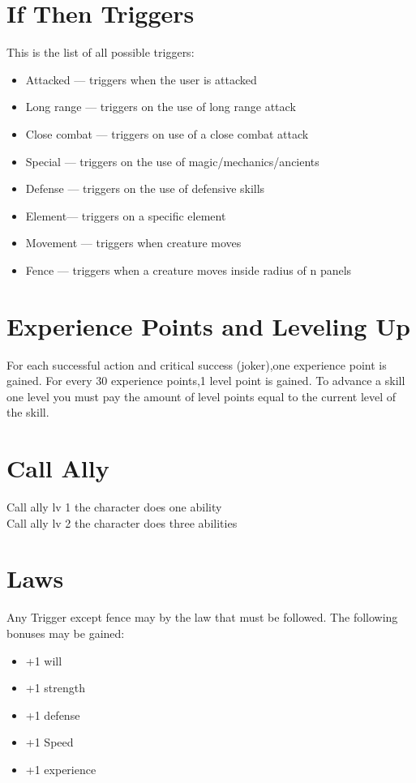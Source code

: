 \section{If Then Triggers}
This is the list of all possible triggers:
\begin{itemize}
\item Attacked --- triggers when the user is attacked
\item Long range --- triggers on the use of long range attack
\item Close combat --- triggers on use of a close combat attack
\item Special --- triggers on the use of magic/mechanics/ancients
\item Defense --- triggers on the use of defensive skills
\item Element--- triggers on a specific element
\item Movement --- triggers when creature moves
\item Fence --- triggers when a creature moves inside radius of n panels
\end{itemize}

\section{Experience Points and Leveling Up}
For each successful action and critical success (joker),one experience point is gained.  For every 30 experience points,1 level point is gained.  To advance a skill one level you must pay the amount of level points equal to the current level of the skill.

\section{Call Ally}
Call ally lv 1 the character does one ability\\
Call ally lv 2 the character does three abilities\\

\section{Laws}
Any Trigger except fence may by the law that must be followed.  The following bonuses may be gained:
\begin{itemize}
\item +1 will
\item +1 strength
\item +1 defense
\item +1 Speed
\item +1 experience
\end{itemize}


